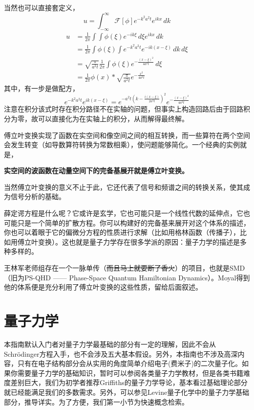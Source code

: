 \documentclass[12pt,a4paper,openany,twoside]{book}
\numberwithin{equation}{section}
\newcommand{\sch}{Schr\"odinger}
\begin{document}
        当然也可以直接套定义，
        \begin{equation*}
          u = \int_{-\infty} ^\infty \mathcal{F}[\phi] e^{-k^2 a^2 t} e^{ikx} \, dk 
        \end{equation*} 
        \begin{align*}
          u &= \frac{1}{2\pi}\int \int \phi(\xi) e^{-ik\xi} \, d\xi e^{ikx}  \, dk\\
            &=\frac{1}{2\pi} \int \phi(\xi) \int e^{-k^2 a^2 t} e^{-ik(x-\xi)} \, dk  \, d\xi \\
            &=\sqrt{\frac{\pi}{a^2 t}}\frac{1}{2\pi} \int \phi(\xi) e^{-\frac{(x-\xi)^2}{4a^2 t}} \, d\xi\\
            &=\frac{1}{2\pi} \phi(x) * \sqrt{\frac{\pi}{a^2 t}} e^{-\frac{x^2}{4 a^2 t}}
        \end{align*}
        其中，有一步是做配方，
        \begin{equation*}
          e^{-k^2a^2 t} e^{ik (x-\xi)} = e^{-a^2 t (k-\frac{i (x-\xi)}{2a^2 t})^2} e^{-\frac{(x-\xi)^2}{4a^2 t}}
        \end{equation*} 
        注意在积分该式时存在积分路径不在实轴的问题，但事实上构造回路后由于回路积分为零，故可以直接化为在实轴上的积分，从而解得最终解。

        傅立叶变换实现了函数在实空间和像空间之间的相互转换，而一些算符在两个空间会发生转变（如导数算符转换为常数相乘），使问题能够简化。一个经典的实例就是，
        \begin{center}
          \textbf{实空间的波函数在动量空间下的完备基展开就是傅立叶变换。}
        \end{center}
        当然傅立叶变换的意义不止于此，它还代表了信号和频谱之间的转换关系，使其成为信号分析的基础。

        薛定谔方程是什么呢？它或许是玄学，它也可能只是一个线性代数的延伸点，它也可能只是一个简单的扩散方程。你可以构建好的完备基来展开对这个体系的描述，你也可以着眼于它的偏微分方程的性质进行求解（比如用格林函数（传播子），比如用傅立叶变换）。这也就是量子力学存在很多学派的原因：量子力学的描述是多种多样的。

        王林军老师组存在一个一脉单传（\sout{而且马上就要断了香火}）的项目，也就是SMD（旧为PS-QHD —— Phase-Space Quantum Hamiltonian Dynamics）。Moyal得到他的体系便是充分利用了傅立叶变换的这些性质，留给后面叙述。


    \chapter{量子力学}
      本指南默认入门者对量子力学最基础的部分有一定的理解，因此不会从\sch 方程入手，也不会涉及五大基本假设。另外，本指南也不涉及高深内容，只有在电子结构部分会从实用的角度简单介绍电子(费米子)的二次量子化。如果你需要量子力学的基础知识，暂时可以参阅各类量子力学教材，但是各类书籍难度差别巨大，我们为初学者推荐Griffiths的量子力学导论，基本看过基础理论部分就已经能满足我们的多数需求。另外，可以参见Levine量子化学中的量子力学基础部分，推导详实。为了方便，我们第一小节为快速概念检索。
\end{document}

